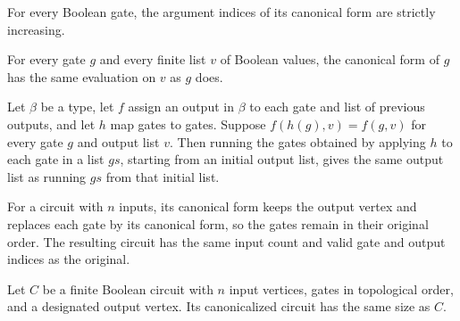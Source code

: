 \begin{lemma}
\label{BoolCircuit.DAGGate.canon_sorted}
\leanok
{}
For every Boolean gate, the argument indices of its canonical form are strictly
increasing.
\end{lemma}

\begin{lemma}
\label{BoolCircuit.DAGGate.eval_canon}
\leanok
{}
For every gate $g$ and every finite list $v$ of Boolean values, the canonical form of
$g$ has the same evaluation on $v$ as $g$ does.
\end{lemma}

\begin{lemma}
\label{BoolCircuit.runWith_map}
\leanok
{}
Let $\beta$ be a type, let $f$ assign an output in $\beta$ to each gate and list of
previous outputs, and let $h$ map gates to gates. Suppose $f(h(g),v)=f(g,v)$ for every
gate $g$ and output list $v$. Then running the gates obtained by applying $h$ to each
gate in a list $gs$, starting from an initial output list, gives the same output list as
running $gs$ from that initial list.
\end{lemma}

\begin{definition}
\label{BoolCircuit.DAGCircuit.canon}
\leanok
{}
For a circuit with $n$ inputs, its canonical form keeps the output vertex and replaces
each gate by its canonical form, so the gates remain in their original order. The
resulting circuit has the same input count and valid gate and output indices as the
original.
\end{definition}

\begin{lemma}
\label{BoolCircuit.DAGCircuit.size_canon}
\leanok
{}
Let $C$ be a finite Boolean circuit with $n$ input vertices, gates in topological order,
and a designated output vertex. Its canonicalized circuit has the same size as $C$.
\end{lemma}

